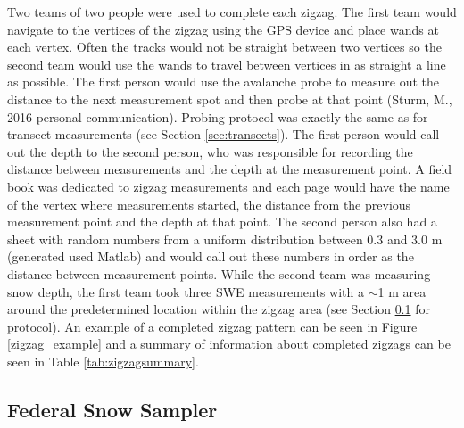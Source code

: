 \documentclass[12pt]{article}
\begin{document}
Two teams of two people were used to complete each zigzag. The first team would navigate to the vertices of the zigzag using the GPS device and place wands at each vertex. Often the tracks would not be straight between two vertices so the second team would use the wands to travel between vertices in as straight a line as possible. The first person would use the avalanche probe to measure out the distance to the next measurement spot and then probe at that point (Sturm, M., 2016 personal communication). Probing protocol was exactly the same as for transect measurements (see Section \ref{sec:transects}). The first person would call out the depth to the second person, who was responsible for recording the distance between measurements and the depth at the measurement point. A field book was dedicated to zigzag measurements and each page would have the name of the vertex where measurements started, the distance from the previous measurement point and the depth at that point. The second person also had a sheet with random numbers from a uniform distribution between 0.3 and 3.0 m (generated used Matlab) and would call out these numbers in order as the distance between measurement points. While the second team was measuring snow depth, the first team took three SWE measurements with a $\sim$1 m area around the predetermined location within the zigzag area (see Section \ref{sec:SWE} for protocol). An example of a completed zigzag pattern can be seen in Figure \ref{zigzag_example} and a summary of information about completed zigzags can be seen in Table \ref{tab:zigzagsummary}.


 \subsection{Federal Snow Sampler}
\label{sec:SWE}
 
\end{document}
